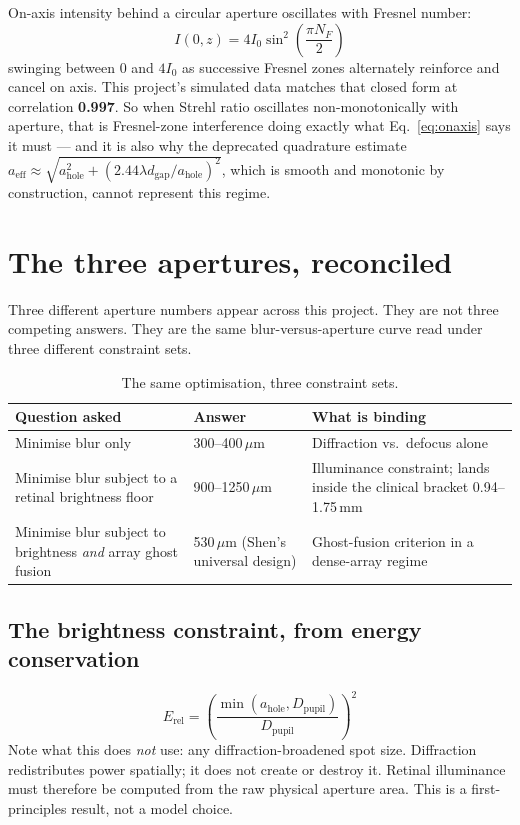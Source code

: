 \documentclass[11pt]{report}
\newcommand{\ahole}{a_{\text{hole}}}
\newcommand{\dgap}{d_{\text{gap}}}
\newcommand{\Dpupil}{D_{\text{pupil}}}
\begin{document}
On-axis intensity behind a circular aperture oscillates with Fresnel number:
\begin{equation}
I(0,z) = 4I_0\sin^2\!\left(\frac{\pi N_F}{2}\right)
\label{eq:onaxis}
\end{equation}
swinging between 0 and $4I_0$ as successive Fresnel zones alternately reinforce and cancel on
axis. This project's simulated data matches that closed form at correlation \textbf{0.997}. So
when Strehl ratio oscillates non-monotonically with aperture, that is Fresnel-zone interference
doing exactly what Eq.~\ref{eq:onaxis} says it must --- and it is also why the deprecated
quadrature estimate $a_{\text{eff}} \approx \sqrt{\ahole^2 + (2.44\lambda\dgap/\ahole)^2}$, which
is smooth and monotonic by construction, cannot represent this regime.

\chapter{The three apertures, reconciled}

Three different aperture numbers appear across this project. They are not three competing
answers. They are the same blur-versus-aperture curve read under three different constraint sets.

\begin{longtable}{p{4.2cm}p{3.0cm}p{6.5cm}}
\caption{The same optimisation, three constraint sets.}\\
\toprule
\textbf{Question asked} & \textbf{Answer} & \textbf{What is binding} \\
\midrule
\endhead
Minimise blur only & 300--400\,$\mu$m & Diffraction vs.\ defocus alone \\
Minimise blur subject to a retinal brightness floor & 900--1250\,$\mu$m & Illuminance constraint;
lands inside the clinical bracket 0.94--1.75\,mm \\
Minimise blur subject to brightness \emph{and} array ghost fusion & 530\,$\mu$m
(Shen's universal design) & Ghost-fusion criterion in a dense-array regime \\
\bottomrule
\end{longtable}

\section{The brightness constraint, from energy conservation}
\begin{equation}
E_{\text{rel}} = \left(\frac{\min(\ahole,\Dpupil)}{\Dpupil}\right)^2
\label{eq:erel}
\end{equation}
Note what this does \emph{not} use: any diffraction-broadened spot size. Diffraction redistributes
power spatially; it does not create or destroy it. Retinal illuminance must therefore be computed
from the raw physical aperture area. This is a first-principles result, not a model choice.
\end{document}
